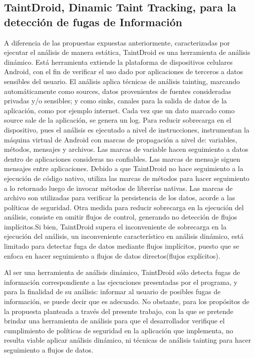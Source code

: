 \subsection{TaintDroid, Dinamic Taint Tracking, para la detección de fugas de
Información}
\label{TaintDroid-Tool}
A diferencia de las propuestas expuestas anteriormente, caracterizadas
por ejecutar el análisis de manera estática, TaintDroid es una herramienta de
análisis dinámico. Está herramienta extiende la plataforma de dispositivos
celulares Android, con el fin de verificar el uso dado por aplicaciones de
terceros a datos sensibles del usuario. El análisis aplica técnicas de análisis
tainting, marcando automáticamente como sources, datos provenientes de fuentes
consideradas privadas y/o sensibles; y como sinks, canales para la salida de
datos de la aplicación, como por ejemplo internet.
Cada vez que un dato marcado como source sale de la aplicación, se genera un log.\newline 
Para reducir sobrecarga en el dispositivo, pues el análisis es ejecutado a nivel
de instrucciones, instrumentan la máquina virtual de Android con marcas de
propagación a nivel de: variables, métodos, mensajes y archivos. Las marcas de
variable hacen seguimiento a datos dentro de aplicaciones consideras no
confiables. Las marcas de mensaje siguen mensajes entre aplicaciones. Debido a
que TaintDroid no hace seguimiento a la ejecución de código nativo, utiliza las
marcas de métodos para hacer seguimiento a lo retornado luego de invocar métodos
de librerías nativas. Las marcas de archivo son utilizadas para verificar la
persistencia de los datos, acorde a las políticas de seguridad.\newline
Otra medida para reducir sobrecarga en la ejecución del análisis, consiste en
omitir flujos de control, generando no detección de flujos
implícitos\cite[pag 12]{TaintDroid}.\newline Si bien, TaintDroid supera el inconveniente de sobrecarga en la ejecución del
análisis, un inconveniente característico en análisis dinámico, está limitado
para detectar fuga de datos mediante flujos implícitos, puesto que se
enfoca en hacer seguimiento a flujos de datos directos(flujos
explícitos).

Al ser una herramienta de análisis dinámico, TaintDroid sólo detecta fugas de
información correspondiente a las ejecuciones presentadas por el programa, y
para la finalidad de su análisis: informar al usuario de posibles fugas de
información, se puede decir que es adecuado. No obstante, para los propósitos de
la propuesta planteada a través del presente trabajo, con la que se pretende
brindar una herramienta de análisis para que el desarrollador verifique el
cumplimiento de políticas de seguridad en la aplicación que implementa, no
resulta viable aplicar análisis dinámico, ni técnicas de análisis tainting para
hacer seguimiento a flujos de datos.

